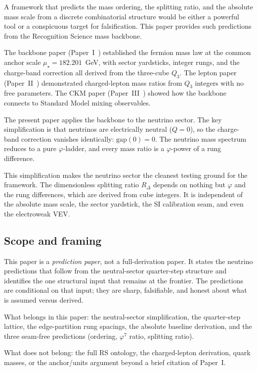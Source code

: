 \documentclass[11pt]{article}
\theoremstyle{remark}
\newcommand{\phig}{\varphi}
\newcommand{\mustar}{\mu_\star}
\newcommand{\Rdel}{R_\Delta}
\begin{document}
A framework that predicts the mass ordering, the splitting
ratio, and the absolute mass scale from a discrete combinatorial
structure would be either a powerful tool or a conspicuous
target for falsification.  This paper provides such predictions
from the Recognition Science mass backbone.

The backbone paper (Paper~I~\cite{backbone}) established the
fermion mass law at the common anchor scale
$\mustar=182.201$~GeV, with sector yardsticks, integer rungs,
and the charge-band correction all derived from the three-cube
$Q_3$.  The lepton paper (Paper~II~\cite{leptons}) demonstrated
charged-lepton mass ratios from $Q_3$ integers with no free
parameters.  The CKM paper (Paper~III~\cite{CKM}) showed how
the backbone connects to Standard Model mixing observables.

The present paper applies the backbone to the neutrino sector.
The key simplification is that neutrinos are electrically
neutral ($Q=0$), so the charge-band correction vanishes
identically: $\mathrm{gap}(0)=0$.  The neutrino mass spectrum
reduces to a pure $\phig$-ladder, and every mass ratio is a
$\phig$-power of a rung difference.

This simplification makes the neutrino sector the cleanest
testing ground for the framework.  The dimensionless splitting
ratio $\Rdel$ depends on nothing but $\phig$ and the rung
differences, which are derived from cube integers.  It is
independent of the absolute mass scale, the sector yardstick,
the SI calibration seam, and even the electroweak VEV.

\subsection{Scope and framing}

This paper is a \emph{prediction paper}, not a full-derivation
paper.  It states the neutrino predictions that follow from
the neutral-sector quarter-step structure and identifies the
one structural input that remains at the frontier.  The
predictions are conditional on that input; they are sharp,
falsifiable, and honest about what is assumed versus derived.

What belongs in this paper: the neutral-sector simplification,
the quarter-step lattice, the edge-partition rung spacings, the
absolute baseline derivation, and the three seam-free predictions
(ordering, $\phig^7$ ratio, splitting ratio).

What does not belong: the full RS ontology, the charged-lepton
derivation, quark masses, or the anchor/units argument beyond a
brief citation of Paper~I.
\end{document}
